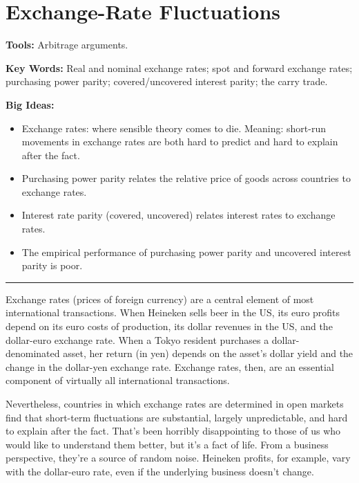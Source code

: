 \chapter{Exchange-Rate Fluctuations}\label{chp:fxf}
\hypertarget{fx}{}

\textbf{Tools:} Arbitrage arguments.

\textbf{Key Words:} Real and nominal exchange rates; spot and forward exchange rates;
 purchasing power parity; covered/uncovered interest parity; the carry trade.

\textbf{Big Ideas:}
\vspace{-0.1in}
\begin{itemize}
\item Exchange rates:  where sensible theory comes to die.
Meaning:  short-run movements in exchange rates are both hard to predict and hard to explain after the fact.
\item Purchasing power parity relates the relative price of goods across countries to exchange rates.
\item Interest rate parity (covered, uncovered) relates interest rates to exchange rates.
\item The empirical performance of purchasing power parity and uncovered interest parity is poor.
\end{itemize}
\rule{\textwidth}{1pt}

Exchange rates (prices of foreign currency)
are a central element of most international transactions.
When Heineken sells beer in the US,
its euro profits depend on its euro costs of production,
its dollar revenues in the US, and the dollar-euro exchange rate.
When a Tokyo resident purchases a dollar-denominated asset,
her return (in yen) depends on the asset's dollar yield
and the change in the dollar-yen exchange rate.
Exchange rates, then, are an essential component  of virtually all
international transactions.

Nevertheless, countries in which exchange rates are determined
in open markets find that
short-term fluctuations are substantial, largely unpredictable,
and hard to explain after the fact.
That's been horribly disappointing to those of us who would like to
understand them better, but it's a fact of life.
From a business perspective, they're a source of random noise.
Heineken profits, for example, vary with the dollar-euro rate,
even if the underlying business doesn't change.

